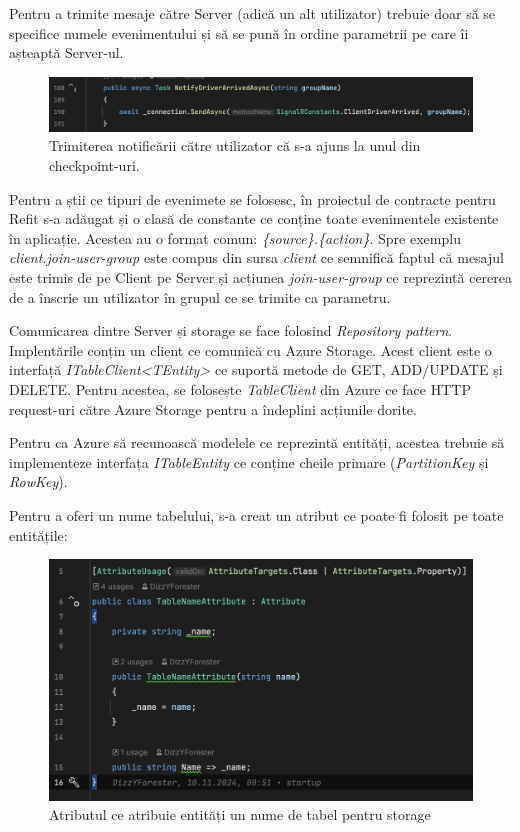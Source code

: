 Pentru a trimite mesaje către Server (adică un alt utilizator) trebuie doar să se specifice numele evenimentului
și să se pună în ordine parametrii pe care îi așteaptă Server-ul.

\begin{figure}[H]
    \centering
    \includegraphics[width=16cm]{Assets/signalrSend.png}
    \caption{Trimiterea notificării către utilizator că s-a ajuns la unul din checkpoint-uri.}
    \label{fig:signalRSend}
\end{figure}

Pentru a știi ce tipuri de evenimete se folosesc, în proiectul de contracte pentru Refit s-a adăugat și o clasă
de constante ce conține toate evenimentele existente în aplicație. Acestea au o format comun:
\textit{\{source\}.\{action\}}. Spre exemplu \textit{client.join-user-group} este compus din sursa \textit{client} ce semnifică faptul că
mesajul este trimis de pe Client pe Server și acțiunea \textit{join-user-group} ce reprezintă cererea de a înscrie un utilizator în grupul ce se trimite ca parametru.

Comunicarea dintre Server și storage se face folosind \textit{Repository pattern}. Implentările conțin un client
ce comunică cu Azure Storage. Acest client este o interfață \textit{ITableClient<TEntity>} ce suportă
metode de GET, ADD/UPDATE și DELETE. Pentru acestea, se folosește \textit{TableClient} din Azure ce face HTTP request-uri
către Azure Storage pentru a îndeplini acțiunile dorite.

Pentru ca Azure să recunoască modelele ce reprezintă entități, acestea trebuie să implementeze interfața
\textit{ITableEntity} ce conține cheile primare (\textit{PartitionKey} și \textit{RowKey}).

Pentru a oferi un nume tabelului, s-a creat un atribut ce poate fi folosit pe toate entitățile:

\begin{figure}[H]
    \centering
    \includegraphics[width=16cm]{Assets/tableAttribute.png}
    \caption{Atributul ce atribuie entități un nume de tabel pentru storage}
    \label{fig:tableAttribute}
\end{figure}

